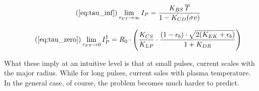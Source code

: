 \begin{equation}
	\tag{\ref{eq:tau_inf}}
	\lim_{\tau_{FT} \to \infty} I_P = \frac{ K_{BS} \, \overline T }{ 1 - K_{CD} ( \sigma v ) }
\end{equation}

\begin{equation}
	\tag{\ref{eq:tau_zero}}
	\lim_{ \tau_{FT} \to 0 } I_P^\ddagger = R_0 \cdot \left( \frac{ K_{CS} }{ K_{LP} } \cdot \frac{ ( 1 - \epsilon_b ) \cdot \sqrt{ 2 ( K_{EK} + \epsilon_b ) } }{ 1 + K_{DR} } \right)
\end{equation}

What these imply at an intuitive level is that at small pulses, current scales with the major radius. While for long pulses, current sales with plasma temperature. In the general case, of course, the problem becomes much harder to predict.

%
